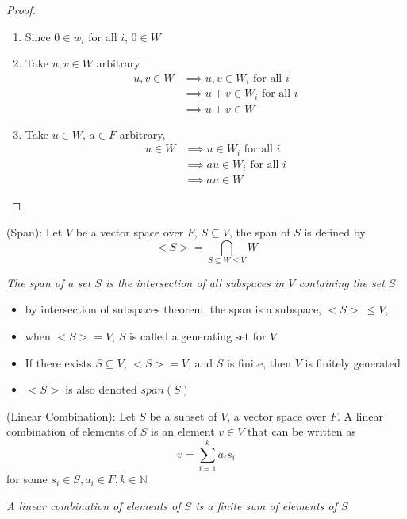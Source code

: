\begin{proof}
\begin{enumerate}
\item Since $0 \in w_i$ for all $i$, $0 \in W$
\item Take $u, v \in W$ arbitrary
    \begin{align*}
        u, v \in W &\implies u, v \in W_i \text{ for all } i \\
        &\implies u + v \in W_i \text{ for all } i \\
        &\implies u + v \in W
    \end{align*}
\item Take $u \in W$, $a \in F$ arbitrary, 
    \begin{align*}
        u \in W & \implies u \in W_i  \text{ for all } i \\
        & \implies au \in W_i  \text{ for all } i \\
        & \implies au \in W
    \end{align*}
\end{enumerate}
\end{proof}

\begin{definition}
(Span): Let $V$ be a vector space over $F$, $S \subseteq V$, the span of $S$ is defined by 
\[
  <S> = \bigcap_{S \subseteq W \leq V} W
\]

\textit{The span of a set $S$ is the intersection of all subspaces in $V$ containing the set $S$}
\end{definition}

\begin{remark}
\begin{itemize}
\item by intersection of subspaces theorem, the span is a subspace, $<S>\ \leq V$, 
\item when $<S> = V$, $S$ is called a generating set for $V$
\item If there exists $S \subseteq V$, $<S> = V$, and $S$ is finite, then $V$ is finitely generated
\item $<S>$ is also denoted $span(S)$
\end{itemize}
\end{remark}

\begin{definition}
(Linear Combination): Let $S$ be a subset of $V$, a vector space over $F$. A linear combination of elements of $S$ is an element $v \in V$ that can be written as 
\[
  v = \sum_{i = 1}^{k} a_i s_i  
\]
for some $s_i \in S, a_i \in F, k \in \mathbb{N}$

\textit{A linear combination of elements of $S$ is a finite sum of elements of $S$}
\end{definition}

